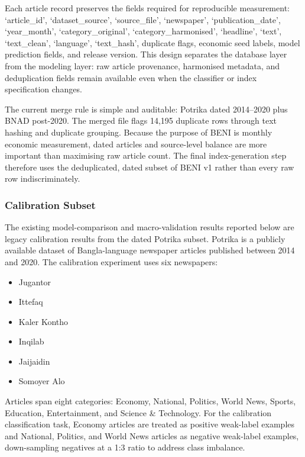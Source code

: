 Each article record preserves the fields required for reproducible measurement: `article\_id', `dataset\_source', `source\_file', `newspaper', `publication\_date', `year\_month', `category\_original', `category\_harmonised', `headline', `text', `text\_clean', `language', `text\_hash', duplicate flags, economic seed labels, model prediction fields, and release version. This design separates the database layer from the modeling layer: raw article provenance, harmonised metadata, and deduplication fields remain available even when the classifier or index specification changes.

The current merge rule is simple and auditable: Potrika dated 2014--2020 plus BNAD post-2020. The merged file flags 14,195 duplicate rows through text hashing and duplicate grouping. Because the purpose of BENI is monthly economic measurement, dated articles and source-level balance are more important than maximising raw article count. The final index-generation step therefore uses the deduplicated, dated subset of BENI v1 rather than every raw row indiscriminately.

\subsubsection{Calibration Subset}

The existing model-comparison and macro-validation results reported below are legacy calibration results from the dated Potrika subset. Potrika is a publicly available dataset of Bangla-language newspaper articles published between 2014 and 2020. The calibration experiment uses six newspapers:

\begin{itemize}
    \item Jugantor
    \item Ittefaq
    \item Kaler Kontho
    \item Inqilab
    \item Jaijaidin
    \item Somoyer Alo
\end{itemize}

Articles span eight categories: Economy, National, Politics, World News, Sports, Education, Entertainment, and Science \& Technology. For the calibration classification task, Economy articles are treated as positive weak-label examples and National, Politics, and World News articles as negative weak-label examples, down-sampling negatives at a 1:3 ratio to address class imbalance.

